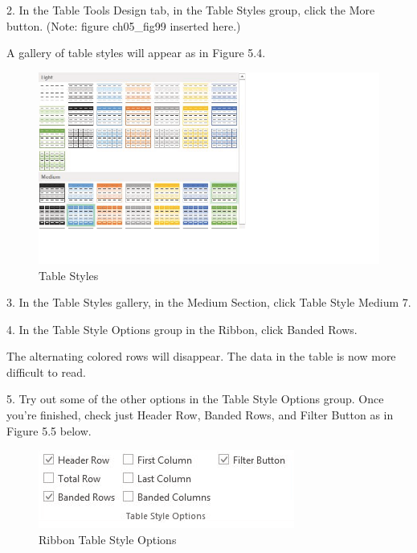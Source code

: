 2. In the Table Tools Design tab, in the Table Styles group, click the More button. (Note: figure ch05\_fig99 inserted here.)

A gallery of table styles will appear as in Figure 5.4.

\begin{figure}[H]
	\centering
	\includegraphics[width=\maxwidth{.95\linewidth}]{gfx/ch05_fig04}
	\caption{Table Styles}
	\label{05:fig04}
\end{figure}








3. In the Table Styles gallery, in the Medium Section, click Table Style Medium 7.

4. In the Table Style Options group in the Ribbon, click Banded Rows.

The alternating colored rows will disappear. The data in the table is now more difficult to read.

5. Try out some of the other options in the Table Style Options group. Once you’re finished, check
just Header Row, Banded Rows, and Filter Button as in Figure 5.5 below.


\begin{figure}[H]
	\centering
	\includegraphics[width=\maxwidth{.95\linewidth}]{gfx/ch05_fig05}
	\caption{Ribbon Table Style Options}
	\label{05:fig05}
\end{figure}





